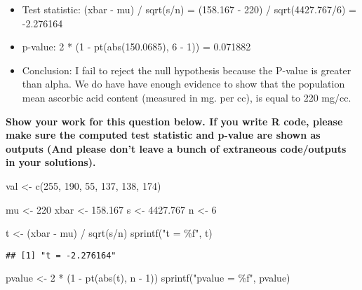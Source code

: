 \documentclass[
]{article}
\newenvironment{Shaded}{\begin{snugshade}}{\end{snugshade}}
\newcommand{\DecValTok}[1]{\textcolor[rgb]{0.00,0.00,0.81}{#1}}
\newcommand{\FloatTok}[1]{\textcolor[rgb]{0.00,0.00,0.81}{#1}}
\newcommand{\FunctionTok}[1]{\textcolor[rgb]{0.00,0.00,0.00}{#1}}
\newcommand{\NormalTok}[1]{#1}
\newcommand{\OtherTok}[1]{\textcolor[rgb]{0.56,0.35,0.01}{#1}}
\newcommand{\SpecialCharTok}[1]{\textcolor[rgb]{0.00,0.00,0.00}{#1}}
\newcommand{\StringTok}[1]{\textcolor[rgb]{0.31,0.60,0.02}{#1}}
\begin{document}
\begin{itemize}
\item
  Test statistic: (xbar - mu) / sqrt(s/n) = (158.167 - 220) /
  sqrt(4427.767/6) = -2.276164
\item
  p-value: 2 * (1 - pt(abs(150.0685), 6 - 1)) = 0.071882
\item
  Conclusion: I fail to reject the null hypothesis because the P-value
  is greater than alpha. We do have have enough evidence to show that
  the population mean ascorbic acid content (measured in mg. per cc), is
  equal to 220 mg/cc.
\end{itemize}

\textbf{Show your work for this question below. If you write R code,
please make sure the computed test statistic and p-value are shown as
outputs (And please don't leave a bunch of extraneous code/outputs in
your solutions).}

\begin{Shaded}
\begin{Highlighting}[]
\NormalTok{val }\OtherTok{\textless{}{-}} \FunctionTok{c}\NormalTok{(}\DecValTok{255}\NormalTok{, }\DecValTok{190}\NormalTok{, }\DecValTok{55}\NormalTok{, }\DecValTok{137}\NormalTok{, }\DecValTok{138}\NormalTok{, }\DecValTok{174}\NormalTok{)}

\NormalTok{mu }\OtherTok{\textless{}{-}} \DecValTok{220}
\NormalTok{xbar }\OtherTok{\textless{}{-}} \FloatTok{158.167}
\NormalTok{s }\OtherTok{\textless{}{-}} \FloatTok{4427.767}
\NormalTok{n }\OtherTok{\textless{}{-}} \DecValTok{6}

\NormalTok{t }\OtherTok{\textless{}{-}}\NormalTok{ (xbar }\SpecialCharTok{{-}}\NormalTok{ mu) }\SpecialCharTok{/} \FunctionTok{sqrt}\NormalTok{(s}\SpecialCharTok{/}\NormalTok{n)}
\FunctionTok{sprintf}\NormalTok{(}\StringTok{"t = \%f"}\NormalTok{, t)}
\end{Highlighting}
\end{Shaded}

\begin{verbatim}
## [1] "t = -2.276164"
\end{verbatim}

\begin{Shaded}
\begin{Highlighting}[]
\NormalTok{pvalue }\OtherTok{\textless{}{-}} \DecValTok{2} \SpecialCharTok{*}\NormalTok{ (}\DecValTok{1} \SpecialCharTok{{-}} \FunctionTok{pt}\NormalTok{(}\FunctionTok{abs}\NormalTok{(t), n }\SpecialCharTok{{-}} \DecValTok{1}\NormalTok{))}
\FunctionTok{sprintf}\NormalTok{(}\StringTok{"pvalue = \%f"}\NormalTok{, pvalue)}
\end{Highlighting}
\end{Shaded}
\end{document}
